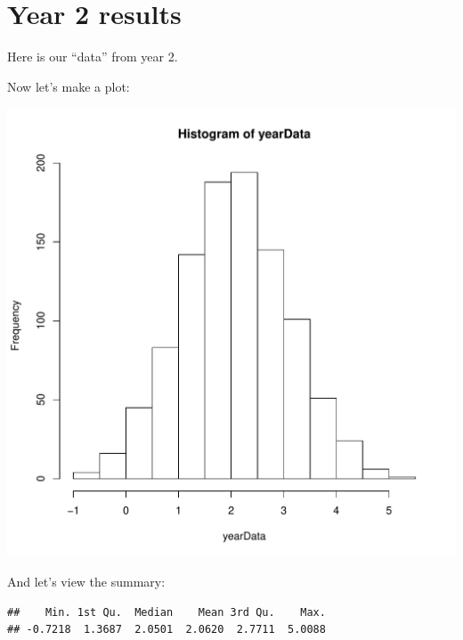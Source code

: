 \section{Year 2 results}
Here is our ``data'' from year 2.
\begin{knitrout}
\color{fgcolor}\begin{kframe}
\begin{alltt}
 \hlkwb{=} \hlstd{(}\hlstd{,}  
\hlopt{::}\hlopt{$}\hlstd{(} \hlstd{=} \hlstd{(}\hlstd{))}
\end{alltt}
\end{kframe}
\end{knitrout}
Now let's make a plot:
\begin{knitrout}
\color{fgcolor}\begin{kframe}
\begin{alltt}
\end{alltt}
\end{kframe}
\includegraphics[width=\maxwidth]{year2/histogram-1} 

\end{knitrout}
And let's view the summary:
\begin{knitrout}
\color{fgcolor}\begin{kframe}
\begin{alltt}
\end{alltt}
\begin{verbatim}
##    Min. 1st Qu.  Median    Mean 3rd Qu.    Max. 
## -0.7218  1.3687  2.0501  2.0620  2.7711  5.0088
\end{verbatim}
\end{kframe}
\end{knitrout}

